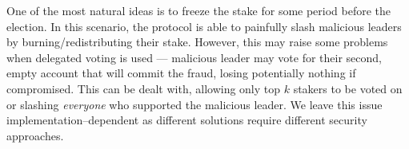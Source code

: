 One of the most natural ideas is to freeze the stake for some period before the
election. In this scenario, the protocol is able to painfully slash
malicious leaders by burning/redistributing their stake. However, this may raise
some problems when delegated voting is used — malicious leader may vote
for their second, empty account that will commit the fraud, losing potentially
nothing if compromised. This can be dealt with, allowing only
top $k$ stakers to be voted on or slashing \textit{everyone} who supported the
malicious leader. We leave this issue implementation–dependent as different solutions
require different security approaches.
